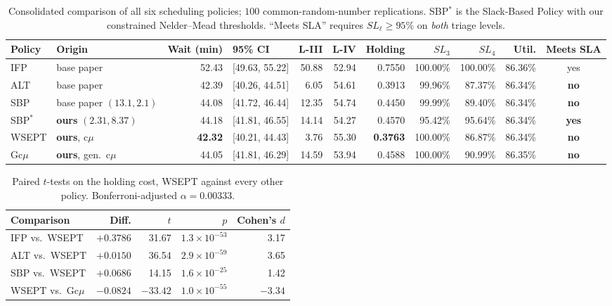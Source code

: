 \documentclass[sigconf,nonacm]{acmart}
\newcommand{\best}[1]{\textbf{#1}}
\begin{document}
\begin{table}[t]
\caption{Consolidated comparison of all six scheduling policies; $100$
         common-random-number replications. SBP$^{*}$ is the Slack-Based Policy
         with our constrained Nelder--Mead thresholds. ``Meets SLA'' requires
         $SL_\ell\ge95\%$ on \emph{both} triage levels.}
\label{tab:master}
\begin{tabular}{@{}llrlrrrrrrc@{}}
\toprule
\textbf{Policy} & \textbf{Origin} & \textbf{Wait (min)} & \textbf{95\% CI} &
\textbf{L-III} & \textbf{L-IV} & \textbf{Holding} &
\textbf{$SL_3$} & \textbf{$SL_4$} & \textbf{Util.} & \textbf{Meets SLA} \\
\midrule
IFP    & base paper                & 52.43 & [49.63, 55.22] & 50.88 & 52.94 & 0.7550 & 100.00\% & 100.00\% & 86.36\% & yes \\
ALT    & base paper                & 42.39 & [40.26, 44.51] & 6.05  & 54.61 & 0.3913 & 99.96\%  & 87.37\%  & 86.34\% & \textbf{no} \\
SBP    & base paper $(13.1,2.1)$   & 44.08 & [41.72, 46.44] & 12.35 & 54.74 & 0.4450 & 99.99\%  & 89.40\%  & 86.34\% & \textbf{no} \\
SBP$^{*}$ & \textbf{ours} $(2.31,8.37)$ & 44.18 & [41.81, 46.55] & 14.14 & 54.27 & 0.4570 & 95.42\%  & 95.64\%  & 86.34\% & \best{yes} \\
WSEPT  & \textbf{ours}, c$\mu$     & \best{42.32} & [40.21, 44.43] & 3.76 & 55.30 & \best{0.3763} & 100.00\% & 86.87\% & 86.34\% & \textbf{no} \\
Gc$\mu$& \textbf{ours}, gen.\ c$\mu$ & 44.05 & [41.81, 46.29] & 14.59 & 53.94 & 0.4588 & 100.00\% & 90.99\%  & 86.35\% & \textbf{no} \\
\bottomrule
\end{tabular}
\end{table}

\begin{table}[t]
\caption{Paired $t$-tests on the holding cost, WSEPT against every other
         policy. Bonferroni-adjusted $\alpha = 0.00333$.}
\label{tab:cmusig}
\small
\begin{tabular}{@{}lrrrr@{}}
\toprule
\textbf{Comparison} & \textbf{Diff.} & $t$ & $p$ & \textbf{Cohen's $d$} \\
\midrule
IFP vs.\ WSEPT    & $+0.3786$ & 31.67  & $1.3\!\times\!10^{-53}$ & 3.17 \\
ALT vs.\ WSEPT    & $+0.0150$ & 36.54  & $2.9\!\times\!10^{-59}$ & 3.65 \\
SBP vs.\ WSEPT    & $+0.0686$ & 14.15  & $1.6\!\times\!10^{-25}$ & 1.42 \\
WSEPT vs.\ Gc$\mu$& $-0.0824$ & $-33.42$ & $1.0\!\times\!10^{-55}$ & $-3.34$ \\
\bottomrule
\end{tabular}
\end{table}
\end{document}
